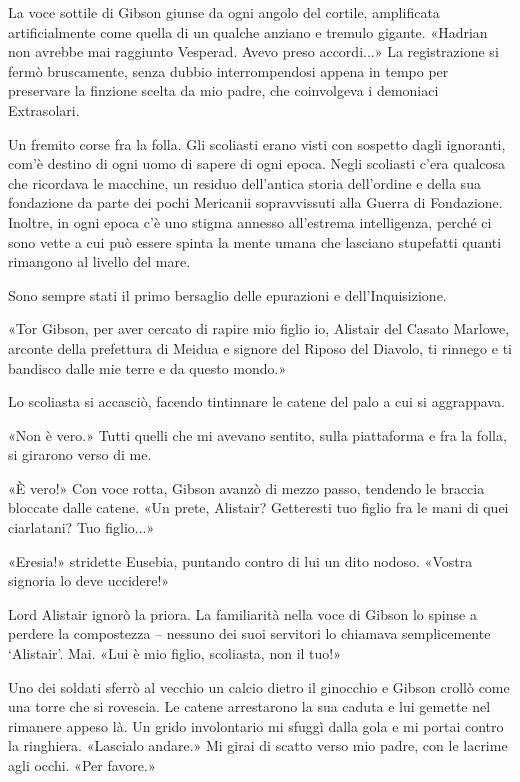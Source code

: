 La voce sottile di Gibson giunse da ogni angolo del cortile, amplificata
artificialmente come quella di un qualche anziano e tremulo gigante.
«Hadrian non avrebbe mai raggiunto Vesperad. Avevo preso accordi...» La
registrazione si fermò bruscamente, senza dubbio interrompendosi appena
in tempo per preservare la finzione scelta da mio padre, che coinvolgeva
i demoniaci Extrasolari.

Un fremito corse fra la folla. Gli scoliasti erano visti con sospetto
dagli ignoranti, com'è destino di ogni uomo di sapere di ogni {epoca}.
Negli scoliasti c'era qualcosa che ricordava le macchine, un residuo
dell'antica storia dell'ordine e della sua fondazione da parte dei pochi
Mericanii sopravvissuti alla Guerra di Fondazione. Inoltre, in ogni
epoca c'è uno stigma annesso all'estrema intelligenza, perché ci sono
vette a cui può essere spinta la mente umana che lasciano stupefatti
quanti rimangono al livello del mare.

Sono sempre stati il primo bersaglio delle epurazioni e
dell'Inquisizione.

«Tor Gibson, per aver cercato di rapire mio figlio io, Alistair del
Casato Marlowe, arconte della prefettura di Meidua e signore del Riposo
del Diavolo, ti rinnego e ti bandisco dalle mie terre e da questo
mondo.»

Lo scoliasta si accasciò, facendo tintinnare le catene del palo a cui si
aggrappava.

«Non è vero.» Tutti quelli che mi avevano sentito, sulla piattaforma e
fra la folla, si girarono verso di me.

«È vero!» Con voce rotta, Gibson avanzò di mezzo passo, tendendo le
braccia bloccate dalle catene. «Un prete, Alistair? Getteresti tuo
figlio fra le mani di quei ciarlatani? Tuo figlio...»

«Eresia!» stridette Eusebia, puntando contro di lui un dito nodoso.
«Vostra signoria lo deve uccidere!»

Lord Alistair ignorò la priora. La familiarità nella voce di Gibson lo
spinse a perdere la compostezza -- nessuno dei suoi servitori lo
chiamava semplicemente `Alistair'. Mai. «Lui è mio figlio, scoliasta,
non il tuo!»

Uno dei soldati sferrò al vecchio un calcio dietro il ginocchio e Gibson
crollò come una torre che si rovescia. Le catene arrestarono la sua
caduta e lui gemette nel rimanere appeso là. Un grido involontario mi
sfuggì dalla gola e mi portai contro la ringhiera. «Lascialo andare.» Mi
girai di scatto verso mio padre, con le lacrime agli occhi. «Per
favore.»

